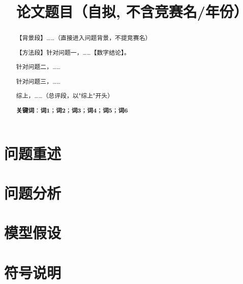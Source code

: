 \documentclass[12pt]{ctexart}
\title{\textbf{论文题目（自拟, 不含竞赛名/年份）}}
\date{}
\begin{document}
\maketitle

\begin{abstract}
【背景段】……（直接进入问题背景，不提竞赛名）

【方法段】针对问题一，……【数字结论】。

针对问题二，……

针对问题三，……

综上，……（总评段，以"综上"开头）

\noindent\textbf{关键词}：\textbf{词1}；\textbf{词2}；\textbf{词3}；\textbf{词4}；\textbf{词5}；\textbf{词6}
\end{abstract}

\section{问题重述}          %
\section{问题分析}          %
\section{模型假设}          %
\section{符号说明}          %
\end{document}
